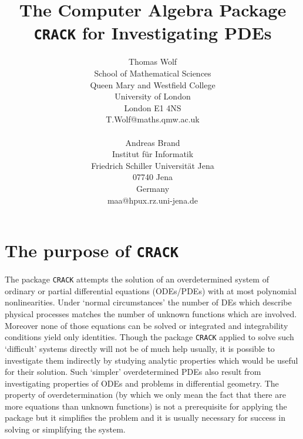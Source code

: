 
\oddsidemargin 10mm  \evensidemargin 10mm
\topmargin 0pt   \headheight 0pt   \headsep 0pt
\footheight 14pt  \footskip 40pt
\textheight 23cm  \textwidth 15cm




\title{The Computer Algebra Package {\tt CRACK} for Investigating PDEs}
\author{Thomas Wolf \\
        School of Mathematical Sciences \\
        Queen Mary and Westfield College \\
        University of London \\
        London E1 4NS \\
        T.Wolf@maths.qmw.ac.uk
\\ \\
Andreas Brand \\ Institut f\"{u}r
Informatik \\ Friedrich Schiller Universit\"{a}t Jena \\ 07740 Jena
\\ Germany \\ maa@hpux.rz.uni-jena.de
}


\maketitle
\tableofcontents
\section{The purpose of {\tt CRACK}}
The package {\tt CRACK} attempts the solution of an overdetermined
system of ordinary or partial differential
equations (ODEs/PDEs) with at most polynomial nonlinearities.
Under `normal circumstances' the number of DEs which describe physical
processes matches the number of unknown functions which are involved.
Moreover none of those equations can be solved or integrated and
integrability conditions yield only identities.  Though the package
{\tt CRACK} applied to solve such `difficult' systems
directly will not be of much  help usually, it is possible to
investigate them indirectly by
studying analytic properties which would be useful for their
solution. Such `simpler' overdetermined PDEs also result from
investigating properties of ODEs and problems in differential geometry.
The property of overdetermination (by which we only mean the fact
that there are more equations than unknown functions) is not a
prerequisite for applying the package but it simplifies the problem
and it is usually necessary for success in solving or simplifying the
system.

